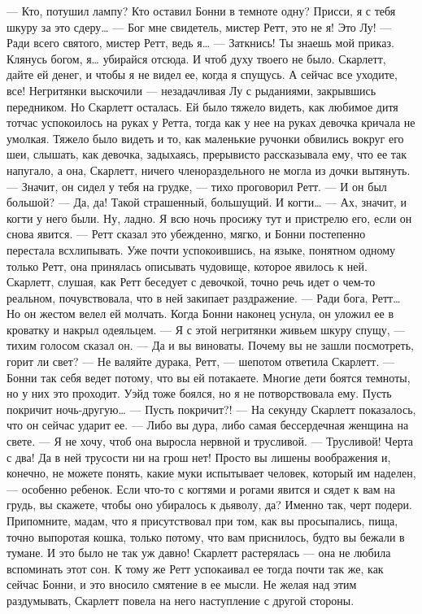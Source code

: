 — Кто, потушил лампу? Кто оставил Бонни в темноте одну? Присси, я с тебя шкуру за это сдеру…
— Бог мне свидетель, мистер Ретт, это не я! Это Лу!
— Ради всего святого, мистер Ретт, ведь я…
— Заткнись! Ты знаешь мой приказ. Клянусь богом, я… убирайся отсюда. И чтоб духу твоего не было. Скарлетт, дайте ей денег, и чтобы я не видел ее, когда я спущусь. А сейчас все уходите, все!
Негритянки выскочили — незадачливая Лу с рыданиями, закрывшись передником. Но Скарлетт осталась. Ей было тяжело видеть, как любимое дитя тотчас успокоилось на руках у Ретта, тогда как у нее на руках девочка кричала не умолкая. Тяжело было видеть и то, как маленькие ручонки обвились вокруг его шеи, слышать, как девочка, задыхаясь, прерывисто рассказывала ему, что ее так напугало, а она, Скарлетт, ничего членораздельного не могла из дочки вытянуть.
— Значит, он сидел у тебя на грудке, — тихо проговорил Ретт. — И он был большой?
— Да, да! Такой страшенный, большущий. И когти…
— Ах, значит, и когти у него были. Ну, ладно. Я всю ночь просижу тут и пристрелю его, если он снова явится. — Ретт сказал это убежденно, мягко, и Бонни постепенно перестала всхлипывать. Уже почти успокоившись, на языке, понятном одному только Ретт, она принялась описывать чудовище, которое явилось к ней. Скарлетт, слушая, как Ретт беседует с девочкой, точно речь идет о чем-то реальном, почувствовала, что в ней закипает раздражение.
— Ради бога, Ретт…
Но он жестом велел ей молчать. Когда Бонни наконец уснула, он уложил ее в кроватку и накрыл одеяльцем.
— Я с этой негритянки живьем шкуру спущу, — тихим голосом сказал он. — Да и вы виноваты. Почему вы не зашли посмотреть, горит ли свет?
— Не валяйте дурака, Ретт, — шепотом ответила Скарлетт. — Бонни так себя ведет потому, что вы ей потакаете. Многие дети боятся темноты, но у них это проходит. Уэйд тоже боялся, но я не потворствовала ему. Пусть покричит ночь-другую…
— Пусть покричит?! — На секунду Скарлетт показалось, что он сейчас ударит ее. — Либо вы дура, либо самая бессердечная женщина на свете.
— Я не хочу, чтоб она выросла нервной и трусливой.
— Трусливой! Черта с два! Да в ней трусости ни на грош нет! Просто вы лишены воображения и, конечно, не можете понять, какие муки испытывает человек, который им наделен, — особенно ребенок. Если что-то с когтями и рогами явится и сядет к вам на грудь, вы скажете, чтобы оно убиралось к дьяволу, да? Именно так, черт подери. Припомните, мадам, что я присутствовал при том, как вы просыпались, пища, точно выпоротая кошка, только потому, что вам приснилось, будто вы бежали в тумане. И это было не так уж давно!
Скарлетт растерялась — она не любила вспоминать этот сон. К тому же Ретт успокаивал ее тогда почти так же, как сейчас Бонни, и это вносило смятение в ее мысли. Не желая над этим раздумывать, Скарлетт повела на него наступление с другой стороны.
